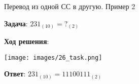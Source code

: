 \documentclass{beamer}
\begin{document}
\hspace*{\fill} \Large{\color{blue}П\color{black}еревод из одной СС в другую. Пример 2}


\small{
\textbf{Задача}: $231_{(10)} = ?_{(2)}$}

\textbf{Ход решения}: 
\begin{center}
    \texttt{[image: images/26\_task.png]}
\end{center}

\textbf{Ответ}: $231_{(10)} = 11100111_{(2)}$
\end{document}
